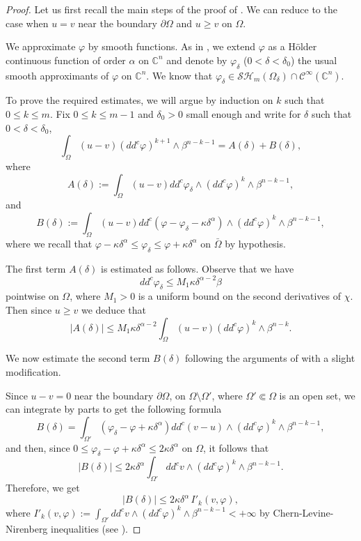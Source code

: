 \documentclass[JEP,XML,SOM,Unicode]{cedram}
\theoremstyle{definition}
\newcommand{\C}{\mathbb{C}}
\begin{document}
\begin{proof}
Let us first recall the main steps of the proof of \cite[Lem.\,4.2]{BZ20}.
We can reduce to the case when $u = v$ near the boundary $\partial \Omega$ and $u \geq v$ on $\Omega$.

We approximate $\varphi$ by smooth functions. As in \cite{BZ20}, we extend $\varphi$ as a Hölder continuous function of order $\alpha$ on $\C^n$ and denote by $\varphi_{\delta}$ ($0 < \delta < \delta_0$) the usual smooth approximants of $\varphi $ on $\C^n$.
We know that $\varphi_\delta \in \mathcal{SH}_m (\Omega_{\delta})\cap\mathcal{C}^{\infty}(\mathbb C^n)$.

To prove the required estimates, we will argue by induction on $k$ such that \hbox{$0\!\leq\!k\!\leq\!m$}. Fix $0 \leq k \leq m-1$ and $\delta_0 > 0$ small enough and write for $\delta$ such that $0 < \delta < \delta_0$,
\[
\int_{\Omega}(u-v) (dd^c\varphi)^{k+1} \wedge\beta^{n-k-1} = A (\delta) + B (\delta),
\]
where
\[
A (\delta):=\int_{\Omega}(u-v)dd^c \varphi_{\delta}\wedge(dd^c\varphi)^k\wedge\beta^{n-k-1},
\]
and
\[
B (\delta) := \int_{\Omega}(u-v) dd^c(\varphi - \varphi_{\delta} - \kappa \delta^\alpha)\wedge(dd^c\varphi)^k\wedge\beta^{n-k-1},
\]
where we recall that $ \varphi - \kappa \delta^\alpha \leq \varphi_\delta \leq \varphi + \kappa \delta^\alpha$ on $\bar{\Omega}$ by hypothesis.

The first term $A (\delta)$ is estimated as follows. Observe that we have
\[
dd^c \varphi_\delta \leq M_1 \kappa \delta^{\alpha -2} \beta
\]
pointwise on $\Omega$, where $M_1 > 0$ is a uniform bound on the second derivatives of $\chi$. Then since $u \geq v$ we deduce that
\begin{equation} \label{eq:estimationA}
\vert A (\delta) \vert \leq M_1 \kappa \delta^{\alpha -2} \int_{\Omega} (u-v) (dd^c \varphi)^k \wedge \beta^{n-k}.
\end{equation}

We now estimate the second term $B (\delta)$ following the arguments of \cite[Lem.\,4.2]{BZ20} with a slight modification.

Since $ u - v = 0$ near the boundary $\partial \Omega$, \ie on $\Omega \setminus \Omega'$, where $\Omega' \Subset \Omega$ is an open set, we can integrate by parts to get the following formula
\[
B (\delta) = \int_{\Omega'} (\varphi_{\delta} - \varphi + \kappa \delta^\alpha) dd^c (v-u) \wedge(dd^c\varphi)^k\wedge\beta^{n-k-1},
\]
and then, since $0 \leq \varphi_{\delta}-\varphi + \kappa \delta^\alpha \leq 2 \kappa \delta^{\alpha}$ on $\Omega$, it follows that
\[
\vert B (\delta)\vert \leq 2 \kappa \delta^{\alpha} \int_{\Omega'} dd^c v \wedge(dd^c\varphi)^k\wedge\beta^{n-k-1}.
\]
Therefore, we get
\begin{equation} \label{eq:estimationB}
|B (\delta)| \leq 2 \kappa \delta^{\alpha} \, I'_k(v,\varphi),
\end{equation}
where $I'_k (v,\varphi) := \int_{\Omega'} dd^c v \wedge(dd^c\varphi)^k\wedge\beta^{n-k-1} < + \infty$ by Chern-Levine-Nirenberg inequalities (see \cite{Lu12}).


\end{proof}
\end{document}
